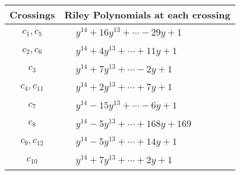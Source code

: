 \documentclass[1p]{elsarticle_modified}
\theoremstyle{definition}
\begin{document}
\begin{tabular}{m{50pt}|m{274pt}}
Crossings & \hspace{64pt}Riley Polynomials at each crossing \\
\hline $$\begin{aligned}c_{1},c_{5}\end{aligned}$$&$\begin{aligned}
&y^{14}+16 y^{13}+\cdots-29 y+1
\end{aligned}$\\
\hline $$\begin{aligned}c_{2},c_{6}\end{aligned}$$&$\begin{aligned}
&y^{14}+4 y^{13}+\cdots+11 y+1
\end{aligned}$\\
\hline $$\begin{aligned}c_{3}\end{aligned}$$&$\begin{aligned}
&y^{14}+7 y^{13}+\cdots-2 y+1
\end{aligned}$\\
\hline $$\begin{aligned}c_{4},c_{11}\end{aligned}$$&$\begin{aligned}
&y^{14}+2 y^{13}+\cdots+7 y+1
\end{aligned}$\\
\hline $$\begin{aligned}c_{7}\end{aligned}$$&$\begin{aligned}
&y^{14}-15 y^{13}+\cdots-6 y+1
\end{aligned}$\\
\hline $$\begin{aligned}c_{8}\end{aligned}$$&$\begin{aligned}
&y^{14}-5 y^{13}+\cdots+168 y+169
\end{aligned}$\\
\hline $$\begin{aligned}c_{9},c_{12}\end{aligned}$$&$\begin{aligned}
&y^{14}-5 y^{13}+\cdots+14 y+1
\end{aligned}$\\
\hline $$\begin{aligned}c_{10}\end{aligned}$$&$\begin{aligned}
&y^{14}+7 y^{13}+\cdots+2 y+1
\end{aligned}$\\
\hline
\end{tabular}\\~\\
\end{document}
